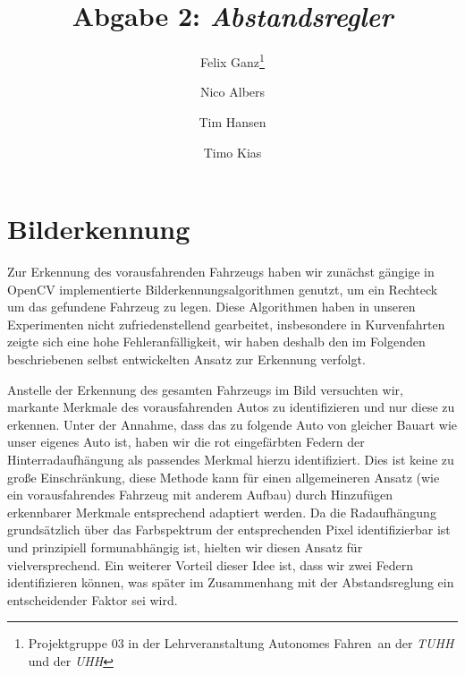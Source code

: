 \documentclass[10pt]{article}
\author{Felix Ganz\thanks{Projektgruppe 03 in der Lehrveranstaltung \glqq Autonomes Fahren\grqq\ an der \emph{TUHH} und der \emph{UHH}}\and Nico Albers\footnotemark[1] \and Tim Hansen\footnotemark[1]\and Timo Kias\footnotemark[1]}
\title{Abgabe 2: \emph{Abstandsregler}}
\begin{document}
\maketitle

\section{Bilderkennung}
    Zur Erkennung des vorausfahrenden Fahrzeugs haben wir zunächst gängige in OpenCV implementierte Bilderkennungsalgorithmen genutzt, um ein Rechteck um das gefundene
    Fahrzeug zu legen.
    Diese Algorithmen haben in unseren Experimenten nicht zufriedenstellend gearbeitet, insbesondere in Kurvenfahrten zeigte sich eine hohe Fehleranfälligkeit, wir haben deshalb den im Folgenden beschriebenen selbst entwickelten Ansatz zur Erkennung verfolgt.

    Anstelle der Erkennung des gesamten Fahrzeugs im Bild versuchten wir, markante Merkmale des vorausfahrenden Autos zu identifizieren und nur diese zu erkennen.
    Unter der Annahme, dass das zu folgende Auto von gleicher Bauart wie unser eigenes Auto ist, haben wir die rot eingefärbten Federn der Hinterradaufhängung als passendes Merkmal hierzu identifiziert.
    Dies ist keine zu große Einschränkung, diese Methode kann für einen allgemeineren Ansatz (wie ein vorausfahrendes Fahrzeug mit anderem Aufbau) durch Hinzufügen erkennbarer Merkmale entsprechend adaptiert werden.
    Da die Radaufhängung grundsätzlich über das Farbspektrum der entsprechenden Pixel identifizierbar ist und prinzipiell formunabhängig ist, hielten wir diesen Ansatz für vielversprechend.
    Ein weiterer Vorteil dieser Idee ist, dass wir zwei Federn identifizieren können, was später im Zusammenhang mit der Abstandsreglung ein entscheidender Faktor sei wird.
\end{document}
